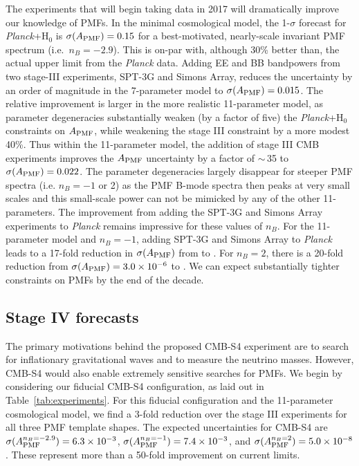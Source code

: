 \documentclass[apj]{emulateapj}
\newcommand{\apmf}{\ensuremath{A_{\rm PMF}}}
\newcommand{\ho}{H\ensuremath{_0}}
\newcommand{\planck}{{\sl Planck}}
\newcommand{\sptnew}{SPT-3G}
\newcommand{\simons}{Simons Array}
\begin{document}
The experiments that will begin taking data in 2017 will dramatically improve our knowledge of PMFs. 
In the minimal cosmological model, the 1-$\sigma$ forecast for \planck{}+\ho{} is $\sigma(\apmf)=\fisherAplk$ for a best-motivated, nearly-scale invariant PMF spectrum (i.e.~$n_B=-2.9$). 
This is on-par with, although 30\% better than, the actual upper limit from the \planck{} data.  
Adding  EE and BB bandpowers from two stage-III experiments, \sptnew{} and \simons{}, reduces the uncertainty by an order of magnitude in the 7-parameter model to $\sigma(\apmf)=0.015$. 
The relative improvement is larger in the more realistic 11-parameter model, as parameter degeneracies substantially weaken (by a factor of five) the \planck+\ho{} constraints on \apmf{}, while weakening the stage III constraint by a  more modest 40\%. 
Thus within the 11-parameter model,  the addition of stage III CMB experiments improves the \apmf{} uncertainty by a factor of $\sim$\,35 to  $\sigma(\apmf)=0.022$. 
The parameter degeneracies largely disappear for steeper PMF spectra (i.e. $n_B=-1$ or 2) as the PMF B-mode spectra then peaks at very small scales and this small-scale power can not be mimicked by any of the other 11-parameters. 
The improvement from adding the SPT-3G and Simons Array experiments to \planck{} remains impressive for these values of $n_B$.
For the 11-parameter model and $n_B=-1$, adding SPT-3G and Simons Array to \planck{} leads to a 17-fold reduction in $\sigma(\apmf)$ from \fisherAlooseNbOneplk{} to \fisherAlooseNbOneSThree{}.
For $n_B=2$, there is a 20-fold reduction from $\sigma(\apmf) = \fisherAlooseNbTwoplk$ to  \fisherAlooseNbTwoSThree. 
We can expect substantially tighter constraints on PMFs by the end of the decade. 

\subsection{Stage IV forecasts}

The primary motivations behind the proposed CMB-S4 experiment are to search for inflationary gravitational waves and to measure the neutrino masses.
However, CMB-S4 would also enable extremely sensitive searches for PMFs. 
We begin by considering our fiducial CMB-S4 configuration, as laid out in Table~\ref{tab:experiments}. 
For this fiducial configuration and the 11-parameter cosmological model, we find a 3-fold reduction over the stage III experiments for all three PMF template shapes. 
The expected uncertainties for CMB-S4 are $\sigma(\apmf^{n_B=-2.9}) =   \fisherAlooseSFour$, $\sigma(\apmf^{n_B=-1}) =   \fisherAlooseNbOneSFour$, and $\sigma(\apmf^{n_B=2}) =   \fisherAlooseNbTwoSFour$. 
These represent more than a 50-fold improvement on current limits. 
\end{document}
